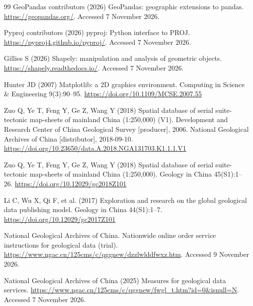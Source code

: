 \documentclass[preprint,12pt,numbers]{elsarticle}
\begin{document}
\begin{thebibliography}{99}
GeoPandas contributors (2026) GeoPandas: geographic extensions to pandas. \url{https://geopandas.org/}. Accessed 7 November 2026.

Pyproj contributors (2026) pyproj: Python interface to PROJ. \url{https://pyproj4.github.io/pyproj/}. Accessed 7 November 2026.

Gillies S (2026) Shapely: manipulation and analysis of geometric objects. \url{https://shapely.readthedocs.io/}. Accessed 7 November 2026.

Hunter JD (2007) Matplotlib: a 2D graphics environment. Computing in Science \& Engineering 9(3):90--95. \url{https://doi.org/10.1109/MCSE.2007.55}

Zuo Q, Ye T, Feng Y, Ge Z, Wang Y (2018) Spatial database of serial suite-tectonic map-sheets of mainland China (1:250,000) (V1). Development and Research Center of China Geological Survey [producer], 2006. National Geological Archives of China [distributor], 2018-09-10. \url{https://doi.org/10.23650/data.A.2018.NGA131703.K1.1.1.V1}

Zuo Q, Ye T, Feng Y, Ge Z, Wang Y (2018) Spatial database of serial suite-tectonic map-sheets of mainland China (1:250,000). Geology in China 45(S1):1--26. \url{https://doi.org/10.12029/gc2018Z101}

Li C, Wu X, Qi F, et al. (2017) Exploration and research on the global geological data publishing model. Geology in China 44(S1):1--7. \url{https://doi.org/10.12029/gc2017Z101}

National Geological Archives of China. Nationwide online order service instructions for geological data (trial). \url{https://www.ngac.cn/125cms/c/qggnew/dzzlwlddfwxz.htm}. Accessed 9 November 2026.

National Geological Archives of China (2025) Measures for geological data services. \url{https://www.ngac.cn/125cms/c/qggnew/fwgl_t.htm?id=0&isnull=N}. Accessed 7 November 2026.

\end{thebibliography}
\end{document}
